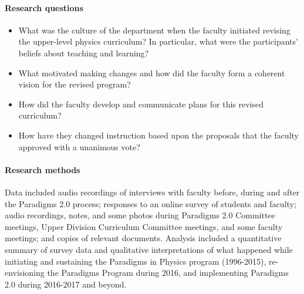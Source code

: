 \documentclass[aps,prstper,reprint]{revtex4-1}
\begin{document}
\paragraph*{Research questions}
\begin{itemize}
\item What was the culture of the department when the faculty initiated revising the upper-level physics curriculum? In particular, what were the participants' beliefs about teaching and learning?
\item What motivated making changes and how did the faculty form a
  coherent vision for the revised program?
\item How did the faculty develop and communicate plans for this revised
  curriculum?
\item How have they changed instruction based upon the proposals that
  the faculty approved with a unanimous vote?
\end{itemize}
\paragraph*{Research methods}
Data included audio recordings of interviews with faculty before, during and after the Paradigms 2.0 process; responses to an online survey of students and faculty; audio recordings, notes, and some photos during Paradigms 2.0 Committee meetings, Upper Division Curriculum Committee meetings, and some faculty meetings; and copies of relevant documents. Analysis included a quantitative summary of survey data and qualitative interpretations of what happened while initiating and sustaining the Paradigms in Physics program (1996-2015), re-envisioning the Paradigms Program during 2016, and implementing Paradigms 2.0 during 2016-2017 and beyond.

\end{document}

